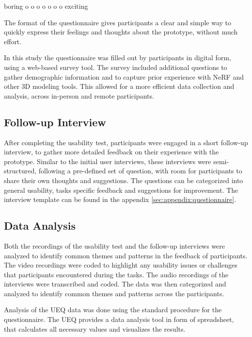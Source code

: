 \begin{center}
  boring \quad o o o o o o o \quad exciting
\end{center}

The format of the questionnaire gives participants a clear and simple way to  quickly express their feelings and thoughts about the prototype, without much effort.

In this study the questionnaire was filled out by participants in digital form, using a web-based survey tool. %
The survey included additional questions to gather demographic information and to capture prior experience with NeRF and other 3D modeling tools.
This allowed for a more efficient data collection and analysis, across in-person and remote participants.

\subsection{Follow-up Interview}
\label{sec:methodology:study:interview}

After completing the usability test, participants were engaged in a short follow-up interview, to gather more detailed feedback on their experience with the prototype. 
Similar to the initial user interviews, these interviews were semi-structured, following a pre-defined set of question, with room for participants to share their own thoughts and suggestions.
The questions can be categorized into general usability, tasks specific feedback and suggestions for improvement.
The interview template can be found in the appendix \ref{sec:appendix:questionnaire}.


\subsection{Data Analysis}
\label{sec:methodology:study:analysis}

Both the recordings of the usability test and the follow-up interviews were analyzed to identify common themes and patterns in the feedback of participants.
The video recordings were coded to highlight any usability issues or challenges that participants encountered during the tasks.
The audio recordings of the interviews were transcribed and coded.
The data was then categorized and analyzed to identify common themes and patterns across the participants.

Analysis of the UEQ data was done using the standard procedure for the questionnaire.
The UEQ provides a data analysis tool in form of spreadsheet, that calculates all necessary values and visualizes the results.
